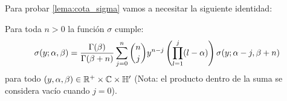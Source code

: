 \documentclass[../../tesis_maestria]{subfiles}
\begin{document}
Para probar \ref{lema:cota_sigma} vamos a necesitar la siguiente identidad:

\begin{lema}\label{lema:integrar_partes_sigma}%
  Para toda $n>0$ la funci\'on $\sigma$ cumple:
  \begin{equation}\label{eq:int_partes_sigma}
    \sigma(y;\alpha,\beta)=
    \frac{\Gamma(\beta)}{\Gamma(\beta+n)}\sum_{j=0}^n
    \binom{n}{j}y^{n-j}\left( \prod_{l=1}^j(l-\alpha) \right)\sigma(y;\alpha-j,\beta+n)
  \end{equation}
  para todo $(y,\alpha,\beta)\in\mathbb{R}^+\times\mathbb{C}\times\mathbb{H}'$ (Nota: el producto dentro de la
  suma se considera vac\'io cuando $j=0$).
\end{lema}%
\end{document}
